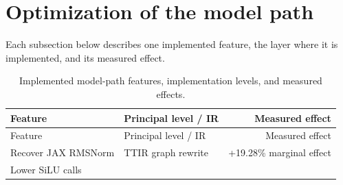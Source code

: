 \documentclass[
  10pt,
  american,
  10pt,
  letterpaper]{article}
\begin{document}
\hypertarget{optimization-of-the-model-path}{%
\section{Optimization of the model
path}\label{optimization-of-the-model-path}}

Each subsection below describes one implemented feature, the layer where
it is implemented, and its measured effect.

\begingroup\footnotesize

\begin{longtable}[]{@{}llr@{}}
\caption{Implemented model-path features, implementation levels, and
measured effects.}\tabularnewline
\toprule
\begin{minipage}[b]{0.30\columnwidth}\raggedright
Feature\strut
\end{minipage} & \begin{minipage}[b]{0.30\columnwidth}\raggedright
Principal level / IR\strut
\end{minipage} & \begin{minipage}[b]{0.30\columnwidth}\raggedleft
Measured effect\strut
\end{minipage}\tabularnewline
\midrule
\endfirsthead
\toprule
\begin{minipage}[b]{0.30\columnwidth}\raggedright
Feature\strut
\end{minipage} & \begin{minipage}[b]{0.30\columnwidth}\raggedright
Principal level / IR\strut
\end{minipage} & \begin{minipage}[b]{0.30\columnwidth}\raggedleft
Measured effect\strut
\end{minipage}\tabularnewline
\midrule
\endhead
\begin{minipage}[t]{0.30\columnwidth}\raggedright
Recover JAX RMSNorm\strut
\end{minipage} & \begin{minipage}[t]{0.30\columnwidth}\raggedright
TTIR graph rewrite\strut
\end{minipage} & \begin{minipage}[t]{0.30\columnwidth}\raggedleft
+19.28\% marginal effect\strut
\end{minipage}\tabularnewline
\begin{minipage}[t]{0.30\columnwidth}\raggedright
Lower SiLU calls\strut
\end{minipage} & \begin{minipage}[t]{0.30\columnwidth}\raggedright

\end{minipage}
\end{longtable}
\end{document}

